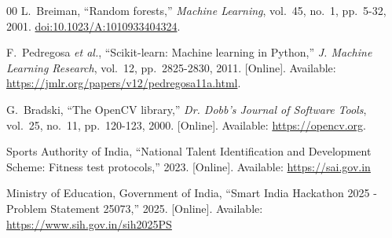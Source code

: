 \documentclass[conference]{IEEEtran}
\begin{document}
\begin{thebibliography}{00}
L.~Breiman, ``Random forests,'' \textit{Machine Learning}, vol.~45, no.~1, pp.~5-32, 2001. \href{https://doi.org/10.1023/A:1010933404324}{doi:10.1023/A:1010933404324}.

F.~Pedregosa \textit{et al.}, ``Scikit-learn: Machine learning in Python,'' \textit{J. Machine Learning Research}, vol.~12, pp.~2825-2830, 2011. [Online]. Available: \url{https://jmlr.org/papers/v12/pedregosa11a.html}.

G.~Bradski, ``The OpenCV library,'' \textit{Dr. Dobb's Journal of Software Tools}, vol.~25, no.~11, pp.~120-123, 2000. [Online]. Available: \url{https://opencv.org}.

Sports Authority of India, ``National Talent Identification and Development Scheme: Fitness test protocols,'' 2023. [Online]. Available: \url{https://sai.gov.in}

Ministry of Education, Government of India, ``Smart India Hackathon 2025 - Problem Statement 25073,'' 2025. [Online]. Available: \url{https://www.sih.gov.in/sih2025PS}

\end{thebibliography}
\end{document}
